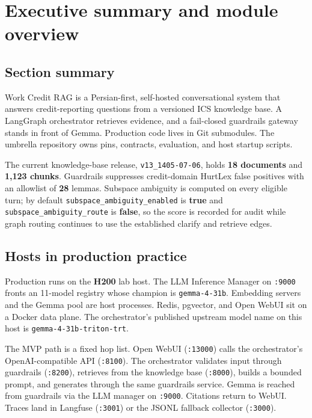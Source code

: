 \chapter{Executive summary and module overview}\label{executive-summary-and-module-overview}

\section{Section summary}\label{section-summary}

Work Credit RAG is a Persian-first, self-hosted conversational system that answers credit-reporting questions from a versioned ICS knowledge base. A LangGraph orchestrator retrieves evidence, and a fail-closed guardrails gateway stands in front of Gemma. Production code lives in Git submodules. The umbrella repository owns pins, contracts, evaluation, and host startup scripts.

The current knowledge-base release, \texttt{v13\_1405-07-06}, holds \textbf{18 documents} and \textbf{1,123 chunks}. Guardrails suppresses credit-domain HurtLex false positives with an allowlist of \textbf{28} lemmas. Subspace ambiguity is computed on every eligible turn; by default \texttt{subspace\_ambiguity\_enabled} is \textbf{true} and \texttt{subspace\_ambiguity\_route} is \textbf{false}, so the score is recorded for audit while graph routing continues to use the established clarify and retrieve edges.

\section{Hosts in production practice}\label{hosts-in-production-practice}

Production runs on the \textbf{H200} lab host. The LLM Inference Manager on \texttt{:9000} fronts an 11-model registry whose champion is \texttt{gemma-4-31b}. Embedding servers and the Gemma pool are host processes. Redis, pgvector, and Open WebUI sit on a Docker data plane. The orchestrator's published upstream model name on this host is \texttt{gemma-4-31b-triton-trt}.

The MVP path is a fixed hop list. Open WebUI (\texttt{:13000}) calls the orchestrator's OpenAI-compatible API (\texttt{:8100}). The orchestrator validates input through guardrails (\texttt{:8200}), retrieves from the knowledge base (\texttt{:8000}), builds a bounded prompt, and generates through the same guardrails service. Gemma is reached from guardrails via the LLM manager on \texttt{:9000}. Citations return to WebUI. Traces land in Langfuse (\texttt{:3001}) or the JSONL fallback collector (\texttt{:3000}).

